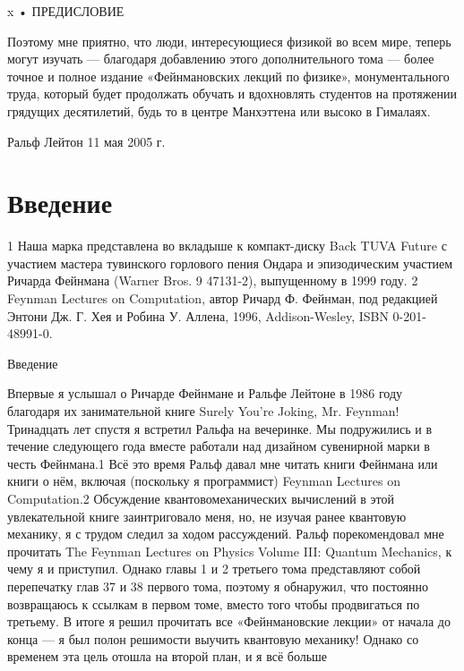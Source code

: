 \documentclass[10pt,oneside]{article}
\begin{document}
x • ПРЕДИСЛОВИЕ\par

Поэтому мне приятно, что люди, интересующиеся физикой во всем мире, теперь могут изучать --- благодаря добавлению этого дополнительного тома --- более точное и полное издание «Фейнмановских лекций по физике», монументального труда, который будет продолжать обучать и вдохновлять студентов на протяжении грядущих десятилетий, будь то в центре Манхэттена или высоко в Гималаях.\par

Ральф Лейтон 11 мая 2005 г.\par

\clearpage
{}
\section*{Введение}
\label{tips-sec-3-введение}
1 Наша марка представлена во вкладыше к компакт-диску Back TUVA Future с участием мастера тувинского горлового пения Ондара и эпизодическим участием Ричарда Фейнмана (Warner Bros. 9 47131-2), выпущенному в 1999 году. 2 Feynman Lectures on Computation, автор Ричард Ф. Фейнман, под редакцией Энтони Дж. Г. Хея и Робина У. Аллена, 1996, Addison-Wesley, ISBN 0-201-48991-0.\par

Введение\par

Впервые я услышал о Ричарде Фейнмане и Ральфе Лейтоне в 1986 году благодаря их занимательной книге Surely You’re Joking, Mr. Feynman! Тринадцать лет спустя я встретил Ральфа на вечеринке. Мы подружились и в течение следующего года вместе работали над дизайном сувенирной марки в честь Фейнмана.1 Всё это время Ральф давал мне читать книги Фейнмана или книги о нём, включая (поскольку я программист) Feynman Lectures on Computation.2 Обсуждение квантовомеханических вычислений в этой увлекательной книге заинтриговало меня, но, не изучая ранее квантовую механику, я с трудом следил за ходом рассуждений. Ральф порекомендовал мне прочитать The Feynman Lectures on Physics Volume III: Quantum Mechanics, к чему я и приступил. Однако главы 1 и 2 третьего тома представляют собой перепечатку глав 37 и 38 первого тома, поэтому я обнаружил, что постоянно возвращаюсь к ссылкам в первом томе, вместо того чтобы продвигаться по третьему. В итоге я решил прочитать все «Фейнмановские лекции» от начала до конца --- я был полон решимости выучить квантовую механику! Однако со временем эта цель отошла на второй план, и я всё больше\par
\end{document}
